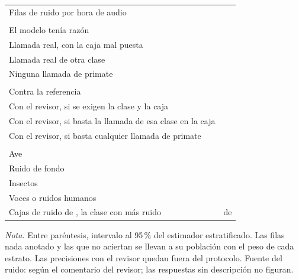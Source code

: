 \begin{table}[htbp]
\begin{threeparttable}
\begin{tabular}{@{}L{9.6cm}r@{}}
            Filas de ruido por hora de audio                            & \uNoisePerHour{} \\
            \addlinespace
             \\
            El modelo tenía razón                                       & \uApparentCorrect{} \\
            Llamada real, con la caja mal puesta                        & \uApparentBox{} \\
            Llamada real de otra clase                                  & \uApparentOther{} \\
            Ninguna llamada de primate                                  & \uApparentNoise{} \\
            \addlinespace
             \\
            Contra la referencia                                        & \uPrecisionRef{} \\
            Con el revisor, si se exigen la clase y la caja             & \uPrecisionStrict{} \\
            Con el revisor, si basta la llamada de esa clase en la caja & \uPrecisionLenient{} \\
            Con el revisor, si basta cualquier llamada de primate       & \uPrecisionCall{} \\
            \addlinespace
             \\
            Ave                                                         & \uNoBird{} \\
            Ruido de fondo                                              & \uNoBackground{} \\
            Insectos                                                    & \uNoInsect{} \\
            Voces o ruidos humanos                                      & \uNoHuman{} \\
            Cajas de ruido de \uNoiseTopClass{}, la clase con más ruido & \uNoiseTopK{} de \uNoiseTopN{} \\
            \bottomrule
        \end{tabular}
        \begin{tablenotes}[flushleft]
            \footnotesize
            \item \textit{Nota.} Entre paréntesis, intervalo al 95\,\% del
            estimador estratificado. Las filas nada anotado y las que no aciertan
            se llevan a su población con el peso de cada estrato. Las precisiones
            con el revisor quedan fuera del protocolo. Fuente del ruido: según el
            comentario del revisor; las respuestas sin descripción no figuran.
        \end{tablenotes}
    \end{threeparttable}
\end{table}

